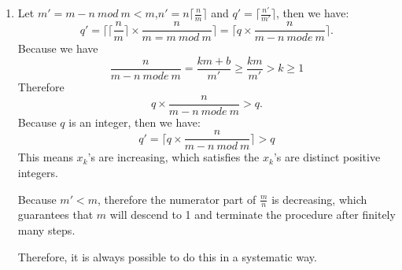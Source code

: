 \documentclass[12pt,a4paper]{article}
\makeatletter
\newtheorem*{solution}{Solution}
\theoremstyle{definition}
\renewenvironment{solution}[1][Solution] {\par\pushQED{\qed}\normalfont\topsep6\p@\@plus6\p@\relax\trivlist\item[\hskip\labelsep\bfseries#1\@addpunct{.}]\ignorespaces}{\popQED\endtrivlist\@endpefalse} \makeatother
\makeatother
\begin{document}
\begin{enumerate}
\begin{solution}
        	Let $m'=m-n\ mod\ m<m$,$n'=n\lceil \frac{n}{m}\rceil$ and $q'=\lceil \frac{n'}{m'} \rceil$, then we have:
        	\begin{equation*}
        	    q'=\lceil\lceil\frac{n}{m}\rceil\times\frac{n}{m=m\ mod\ m}\rceil=\lceil q\times\frac{n}{m-n\ mode\ m}\rceil.
        	\end{equation*}
            Because we have
            \begin{equation*}
            	\frac{n}{m-n\ mode\ m}=\frac{km+b}{m'}\ge\frac{km}{m'}>k\ge 1
            \end{equation*}
            Therefore
        	\begin{equation*}
        	    q\times\frac{n}{m-n\ mode\ m}>q.
        	\end{equation*}
        	Because $q$ is an integer, then we have:
        	\begin{equation*}
        	    q'=\lceil q\times\frac{n}{m-n\ mod\ m}\rceil>q
        	\end{equation*}
        	This means $x_k$'s are increasing, which satisfies the $x_k$'s are distinct positive integers.
        	
        	Because $m'<m$, therefore the numerator part of $\frac{m}{n}$ is decreasing, which guarantees that $m$ will descend to 1 and terminate the procedure after finitely many steps.
        	
        	Therefore, it is always possible to do this in a systematic way.
        	

\end{solution}
\end{enumerate}
\end{document}

